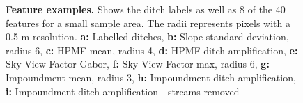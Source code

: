 \documentclass[11pt, review]{elsarticle} %
\begin{document}
\begin{figure} [!htb]
    \caption{\textbf{Feature examples.} Shows the ditch labels as well as 8 of the 40 features for a small sample area. The radii represents pixels with a 0.5 m resolution. \newline \textbf{a:} Labelled ditches, \textbf{b:} Slope standard deviation, radius 6, \textbf{c:} HPMF mean, radius 4, \textbf{d:} HPMF ditch amplification, \textbf{e:} Sky View Factor Gabor, \textbf{f:} Sky View Factor max, radius 6, \textbf{g:} Impoundment mean, radius 3, \textbf{h:} Impoundment ditch amplification, \textbf{i:} Impoundment ditch amplification - streams removed}
    \label{fig:features}
\end{figure}
\end{document}
